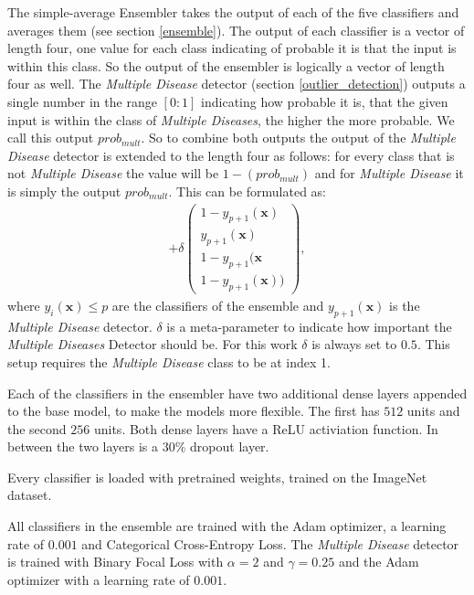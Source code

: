 \documentclass[10pt,twocolumn,letterpaper]{article}
\begin{document}
The simple-average Ensembler takes the output of each of the five classifiers and averages them (see section \ref{ensemble}). The output of each classifier is a vector of length four, one value for each class indicating of probable it is that the input is within this class. So the output of the ensembler is logically a vector of length four as well. The \textit{Multiple Disease} detector (section \ref{outlier_detection}) outputs a single number in the range $[0:1]$ indicating how probable it is, that the given input is within the class of \textit{Multiple Diseases}, the higher the more probable. We call this output $prob_{mult}$. So to combine both outputs the output of the \textit{Multiple Disease} detector is extended to the length four as follows: for every class that is not \textit{Multiple Disease} the value will be $1-(prob_{mult})$ and for \textit{Multiple Disease} it is simply the output $prob_{mult}$. This can be formulated as:
\begin{align}
[\frac{1}{p}\sum_{i=1}^{p}(1-\delta)y_i(\mathbf{x})] + \delta \begin{pmatrix} 1-y_{p+1}(\mathbf{x}) \\ y_{p+1}(\mathbf{x}) \\ 1-y_{p+1}(\mathbf{x} \\ 1-y_{p+1}(\mathbf{x}) )\end{pmatrix},
\end{align}
where $y_i(\mathbf{x}) \leq p$ are the classifiers of the ensemble and  $y_{p+1}(\mathbf{x})$ is the \textit{Multiple Disease} detector. $\delta$ is a meta-parameter to indicate how important the \textit{Multiple Diseases} Detector should be. For this work $\delta$ is always set to $0.5$. This setup requires the \textit{Multiple Disease} class to be at index 1.

Each of the classifiers in the ensembler have two additional dense layers appended to the base model, to make the models more flexible. The first has $512$ units and the second $256$ units. Both dense layers have a  ReLU activiation function. In between the two layers is a $30\%$ dropout layer.



Every classifier is loaded with pretrained weights, trained on the ImageNet \cite{deng2009imagenet} dataset. 

All classifiers in the ensemble are trained with the Adam optimizer, a learning rate of $0.001$ and Categorical Cross-Entropy Loss. The \textit{Multiple Disease} detector is trained with Binary Focal Loss \cite{lin2017focal} with $\alpha = 2$ and $\gamma = 0.25$ and the Adam optimizer with a learning rate of $0.001$.
\end{document}
